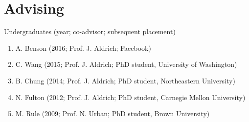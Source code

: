 \documentclass[10pt,letterpaper]{article}
\renewenvironment{itemize}{
  \begin{list}{}{
    \setlength{\leftmargin}{1.5em}
    \setlength{\itemsep}{0.25em}
    \setlength{\parskip}{0pt}
    \setlength{\parsep}{0.25em}
  }
}{
  \end{list}
}
\begin{document}
\section*{Advising}

\begin{itemize}
\item Undergraduates (year; co-advisor; subsequent placement)
  \begin{enumerate}
  \item A. Benson (2016; Prof. J. Aldrich; Facebook)
  \item C. Wang (2015; Prof. J. Aldrich; PhD student, University of Washington)
  \item B. Chung (2014; Prof. J. Aldrich; PhD student, Northeastern University)
  \item N. Fulton (2012; Prof. J. Aldrich; PhD student, Carnegie Mellon University)
  \item M. Rule (2009; Prof. N. Urban; PhD student, Brown University)
  \end{enumerate}
\end{itemize}


\end{document}

